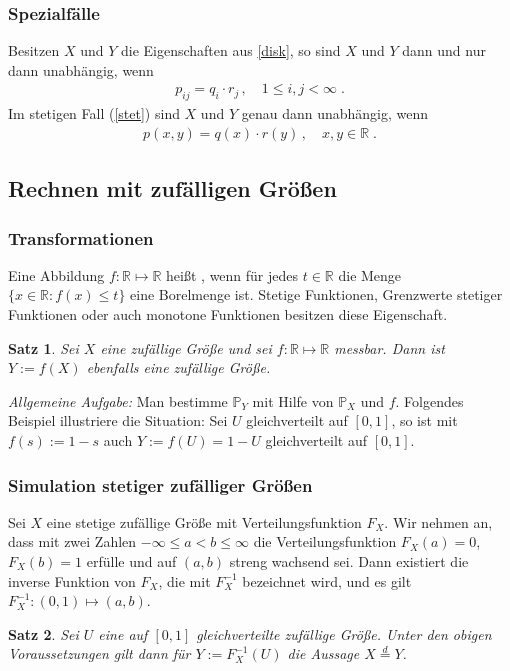 \documentclass[ngerman,draft,parskip=half,twoside]{scrartcl}
\newtheorem{thm}{Satz}[section]
\newcommand*{\highl}[2][]{\textbf{\boldmath{#2}}%
  \ifthenelse{\equal{#1}{}}{\index{#2}}{\index{#1}}%
}
\newcommand*{\R}{\mathbb{R}}      %
\newcommand*{\WKM}{\mathbb{P}}      %
\begin{document}
\subsubsection{Spezialfälle}

Besitzen $X$ und $Y$ die Eigenschaften aus \autoref{disk}, so sind $X$ und $Y$
dann und nur dann unabhängig, wenn
\begin{gather*}
  p_{ij}=q_i\cdot r_j\,,\quad 1\le i,j<\infty\;.
\end{gather*}
Im stetigen Fall (\autoref{stet}) sind $X$ und $Y$ genau dann unabhängig, wenn
\begin{gather*}
  p(x,y)=q(x)\cdot r(y)\,,\quad x,y\in\R\;.
\end{gather*}

\subsection{Rechnen mit zufälligen Größen}
\subsubsection{Transformationen}

Eine Abbildung $f\colon\R\mapsto\R$ heißt \highl{messbar}, wenn für jedes
$t\in\R$ die Menge $\{x\in \R \colon f(x)\le t\}$ eine Borelmenge ist. Stetige
Funktionen, Grenzwerte stetiger Funktionen oder auch monotone Funktionen
besitzen diese Eigenschaft.
\begin{thm}
  Sei $X$ eine zufällige Größe und sei $f\colon\R\mapsto\R$ messbar. Dann ist
  $Y:=f(X)$ ebenfalls eine zufällige Größe.
\end{thm}

\textit{Allgemeine Aufgabe:}
Man bestimme $\WKM_Y$ mit Hilfe von $\WKM_X$ und $f$. Folgendes Beispiel
illustriere die Situation: Sei $U$ gleichverteilt auf $[0,1]$, so ist mit
$f(s):=1-s$ auch $Y:=f(U)=1-U$ gleichverteilt auf $[0,1]$.

\subsubsection{Simulation stetiger zufälliger Größen}

Sei $X$ eine stetige zufällige Größe mit Verteilungsfunktion $F_X$. Wir nehmen
an, dass mit zwei Zahlen $-\infty\le a<b\le\infty$ die Verteilungsfunktion
$F_X(a)=0$, $F_X(b)=1$ erfülle und auf $(a,b)$ streng wachsend sei. Dann
existiert die inverse Funktion von $F_X$, die mit $F_X^{-1}$ bezeichnet wird,
und es gilt $F_X^{-1}\colon(0,1)\mapsto (a,b)$.
\begin{thm}
  Sei $U$ eine auf $[0,1]$ gleichverteilte zufällige Größe. Unter den obigen
  Voraussetzungen gilt dann für $Y:=F_X^{-1}(U)$ die Aussage $X\stackrel{d}{=}
  Y$.
\end{thm}
\end{document}
